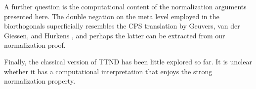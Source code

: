 \documentclass[a4paper,USenglish,cleveref, autoref, thm-restate]{lipics-v2019}
\begin{document}
A further question is the computational content of the normalization
arguments presented here.  The double negation on the meta level
employed in the biorthogonals superficially resembles the CPS
translation by Geuvers, van der Giessen, and Hurkens
\cite{geuversGiessenHurkens:fundinf19}, and perhaps the latter can be
extracted from our normalization proof.

Finally, the classical version of TTND has been little explored so
far.  It is unclear whether it has a computational interpretation that
enjoys the strong normalization property.







\end{document}
